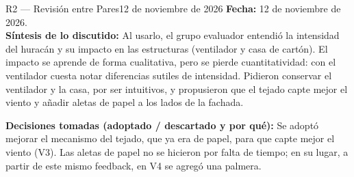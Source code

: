 \documentclass[11pt,a4paper]{article}
\begin{document}
	\begin{revisionbox}{R2 — Revisión entre Pares}{12 de noviembre de 2026}
		\noindent\textbf{Fecha:} 12 de noviembre de 2026.\\
		\textbf{Síntesis de lo discutido:} Al usarlo, el grupo evaluador entendió la intensidad del huracán y su impacto en las estructuras (ventilador y casa de cartón). El impacto se aprende de forma cualitativa, pero se pierde cuantitatividad: con el ventilador cuesta notar diferencias sutiles de intensidad. Pidieron conservar el ventilador y la casa, por ser intuitivos, y propusieron que el tejado capte mejor el viento y añadir aletas de papel a los lados de la fachada.

		\vspace{0.15cm}
		\noindent\textbf{Decisiones tomadas (adoptado / descartado y por qué):}
		Se adoptó mejorar el mecanismo del tejado, que ya era de papel, para que capte mejor el viento (V3). Las aletas de papel no se hicieron por falta de tiempo; en su lugar, a partir de este mismo feedback, en V4 se agregó una palmera.
	\end{revisionbox}

	\vspace{0.4cm}
\end{document}
